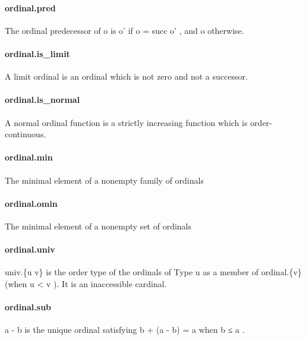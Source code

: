 \documentclass{article}
\begin{document}
\paragraph{ordinal.pred}
\par
The ordinal predecessor of 
\colorbox[RGB]{253,246,227}{{{{\color[RGB]{101, 123, 131} o }}}} is 
\colorbox[RGB]{253,246,227}{{{{\color[RGB]{101, 123, 131} o' }}}} if 
\colorbox[RGB]{253,246,227}{{{{\color[RGB]{101, 123, 131} o  }}}{{{\color[RGB]{181, 137, 0} = }}}{{{\color[RGB]{101, 123, 131}  succ o' }}}},
and 
\colorbox[RGB]{253,246,227}{{{{\color[RGB]{101, 123, 131} o }}}} otherwise.
\paragraph{ordinal.is\_limit}
\par
A limit ordinal is an ordinal which is not zero and not a successor.
\paragraph{ordinal.is\_normal}
\par
A normal ordinal function is a strictly increasing function which is
order-continuous.
\paragraph{ordinal.min}
\par
The minimal element of a nonempty family of ordinals
\paragraph{ordinal.omin}
\par
The minimal element of a nonempty set of ordinals
\paragraph{ordinal.univ}
\par
\colorbox[RGB]{253,246,227}{{{{\color[RGB]{101, 123, 131} univ.\{u v\} }}}} is the order type of the ordinals of 
\colorbox[RGB]{253,246,227}{{{{\color[RGB]{38, 139, 210} Type }}}{{{\color[RGB]{101, 123, 131}  u }}}} as a member
of 
\colorbox[RGB]{253,246,227}{{{{\color[RGB]{101, 123, 131} ordinal.\{v\} }}}} (when 
\colorbox[RGB]{253,246,227}{{{{\color[RGB]{101, 123, 131} u  }}}{{{\color[RGB]{181, 137, 0} < }}}{{{\color[RGB]{101, 123, 131}  v }}}}). It is an inaccessible cardinal.
\paragraph{ordinal.sub}
\par
\colorbox[RGB]{253,246,227}{{{{\color[RGB]{101, 123, 131} a  }}}{{{\color[RGB]{181, 137, 0} - }}}{{{\color[RGB]{101, 123, 131}  b }}}} is the unique ordinal satisfying
\colorbox[RGB]{253,246,227}{{{{\color[RGB]{101, 123, 131} b  }}}{{{\color[RGB]{181, 137, 0} + }}}{{{\color[RGB]{101, 123, 131}  (a  }}}{{{\color[RGB]{181, 137, 0} - }}}{{{\color[RGB]{101, 123, 131}  b)  }}}{{{\color[RGB]{181, 137, 0} = }}}{{{\color[RGB]{101, 123, 131}  a }}}} when 
\colorbox[RGB]{253,246,227}{{{{\color[RGB]{101, 123, 131} b  }}}{{{\color[RGB]{181, 137, 0} ≤ }}}{{{\color[RGB]{101, 123, 131}  a }}}}.
\end{document}
